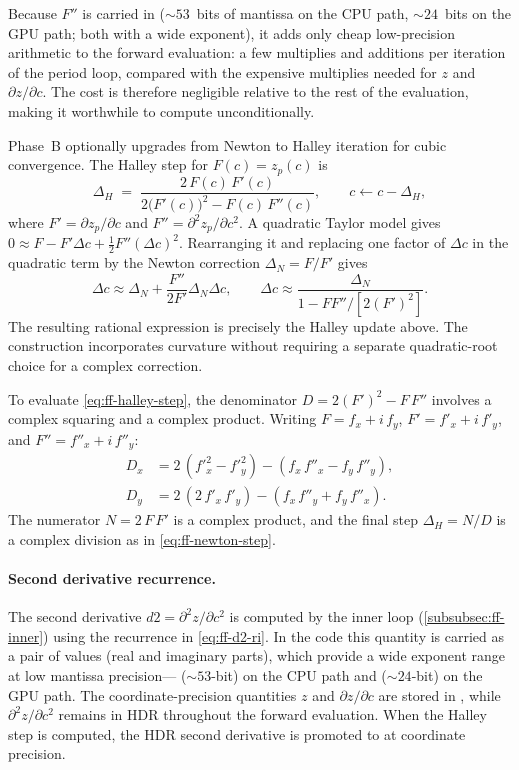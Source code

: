 Because $F''$ is carried in  (${\sim}53$~bits of
mantissa on the CPU path, ${\sim}24$~bits on the GPU path; both with a
wide exponent), it adds only cheap low-precision arithmetic to
the forward evaluation: a few  multiplies and additions per
iteration of the period loop, compared with the expensive 
multiplies needed for $z$ and $\partial z/\partial c$.  The cost is therefore
negligible relative to the rest of the evaluation, making it worthwhile to
compute unconditionally.

Phase~B optionally upgrades from Newton to Halley iteration for cubic
convergence.  The Halley step for $F(c) = z_p(c)$ is
\begin{equation}\label{eq:ff-halley-step}
\Delta_H \;=\;
  \frac{2\,F(c)\,F'(c)}
       {2\bigl(F'(c)\bigr)^2 - F(c)\,F''(c)},
\qquad c \leftarrow c - \Delta_H,
\end{equation}
where $F'=\partial z_p/\partial c$ and $F''=\partial^2 z_p/\partial c^2$.
A quadratic Taylor model gives
$0\approx F-F'\Delta c+\tfrac12F''(\Delta c)^2$.
Rearranging it and replacing one factor of $\Delta c$ in the quadratic term
by the Newton correction $\Delta_N=F/F'$ gives
\[
\Delta c\approx\Delta_N+\frac{F''}{2F'}\Delta_N\Delta c,
\qquad
\Delta c\approx\frac{\Delta_N}{1-FF''/[2(F')^2]}.
\]
The resulting rational expression is precisely the Halley update above.
The construction incorporates curvature without requiring a separate
quadratic-root choice for a complex correction.

To evaluate \eqref{eq:ff-halley-step}, the denominator $D = 2(F')^2 - F\,F''$ involves a complex squaring and a
complex product.  Writing $F = f_x + i\,f_y$, $F' = f'_x + i\,f'_y$, and
$F'' = f''_x + i\,f''_y$:
\begin{align}
D_x &= 2\,(f'^2_x - f'^2_y) - (f_x\,f''_x - f_y\,f''_y), \\
D_y &= 2\,(2\,f'_x\,f'_y) - (f_x\,f''_y + f_y\,f''_x).
\end{align}
The numerator $N = 2\,F\,F'$ is a complex product, and the final step
$\Delta_H = N / D$ is a complex division as in \cref{eq:ff-newton-step}.

\paragraph{Second derivative recurrence.}
The second derivative $d2 = \partial^2 z/\partial c^2$ is computed by the
inner loop (\cref{subsubsec:ff-inner}) using the recurrence in
\cref{eq:ff-d2-ri}.  In the code this quantity is carried as a pair of
 values (real and imaginary parts), which provide a
wide exponent range at low mantissa precision---
(${\sim}53$-bit) on the CPU path and 
(${\sim}24$-bit) on the GPU path.  The coordinate-precision
quantities $z$ and $\partial z/\partial c$ are stored in ,
while $\partial^2 z/\partial c^2$ remains in HDR throughout the forward
evaluation.  When the Halley step is computed, the HDR second
derivative is promoted to  at coordinate precision.

